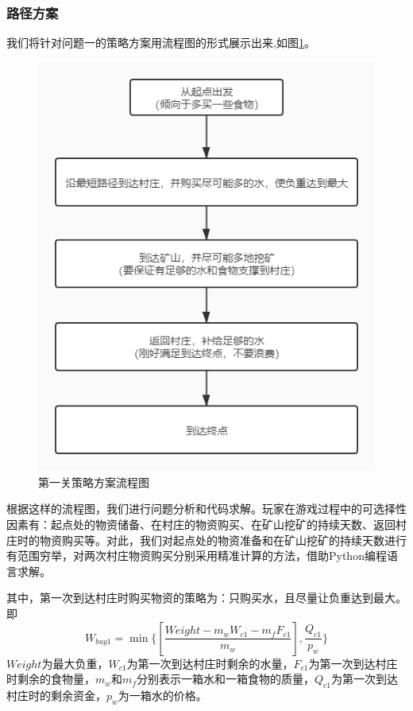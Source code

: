 \documentclass[withoutpre]{cumcmthesis} %
\begin{document}
\subsubsection{路径方案}
我们将针对问题一的策略方案用流程图的形式展示出来,如图\ref{fig:map1lc}。
\begin{figure}[h]
	\centering
	\includegraphics[scale=0.4]{figures/map1liuchengtu}
	\caption{第一关策略方案流程图}
	\label{fig:map1lc}
\end{figure}
根据这样的流程图，我们进行问题分析和代码求解。玩家在游戏过程中的可选择性因素有：起点处的物资储备、在村庄的物资购买、在矿山挖矿的持续天数、返回村庄时的物资购买等。对此，我们对起点处的物资准备和在矿山挖矿的持续天数进行有范围穷举，对两次村庄物资购买分别采用精准计算的方法，借助Python编程语言求解。

其中，第一次到达村庄时购买物资的策略为：只购买水，且尽量让负重达到最大。即
\begin{equation}
	W_{buy1}=\min\{[\displaystyle \frac{Weight-m_wW_{c1}-m_fF_{c1}}{m_w}],\frac{Q_{c1}}{p_w}\}
\end{equation}
$Weight$为最大负重，$W_{c1}$为第一次到达村庄时剩余的水量，$F_{c1}$为第一次到达村庄时剩余的食物量，$m_w$和$m_f$分别表示一箱水和一箱食物的质量，$Q_{c1}$为第一次到达村庄时的剩余资金，$p_w$为一箱水的价格。\\
\end{document}
